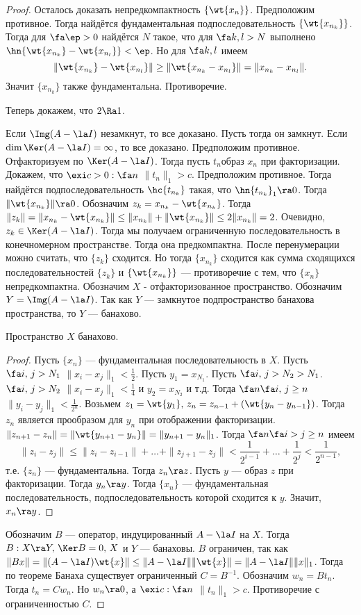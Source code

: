 \documentclass[a4paper]{article}
\begin{document}
\begin{proof}
Осталось доказать непредкомпактность $\{\wt{x_n}\}$.
Предположим противное. Тогда найдётся фундаментальная подпоследовательность
$\{\wt{x_{n_k}}\}$. Тогда для $\fa \ep>0$ найдётся $N$ такое, что для $\fa k,l>N$ выполнено $\hn{\wt{x_{n_k}}-\wt{x_{n_l}}}<\ep$.
Но для $\fa k,l$ имеем
$$\|\wt{x_{n_k}}-\wt{x_{n_l}}\|\ge \|\wt{x_{n_k}-x_{n_l}}\|=\|x_{n_k}-x_{n_l}\|.$$
Значит $\{x_{n_k}\}$ также фундаментальна. Противоречие.

Теперь докажем, что $2\Ra1$.

Если $\Img(A-\la I)$ незамкнут, то все доказано. Пусть тогда  он замкнут. Если $\dim \Ker(A-\la I)=\infty$,
то все доказано. Предположим противное. Отфакторизуем по $\Ker(A-\la I)$. Тогда пусть $t_n$\т образ $x_n$
при факторизации. Докажем, что $\exi c>0: \fa n$ $\|t_n\|_1>c$. Предположим противное. Тогда найдётся
подпоследовательность $\hc{t_{n_k}}$ такая, что $\hn{t_{n_k}}_1\ra 0$. Тогда
$\|\wt{x_{n_k}}\|\ra 0$. Обозначим $z_k=x_{n_k}-\wt{x_{n_k}}$. Тогда
$\|z_k\|=\|x_{n_k}-\wt{x_{n_k}}\|\le\|x_{n_k}\|+\|\wt{x_{n_k}}\|\le 2\|x_{n_k}\|=2$. Очевидно,
$z_k \in \Ker(A-\la I)$. Тогда мы получаем ограниченную последовательность в конечномерном пространстве.
Тогда она предкомпактна. После перенумерации можно считать, что $\{z_k\}$ сходится. Но тогда $\{x_{n_k}\}$
сходится как сумма сходящихся последовательностей $\{z_k\}$ и $\{\wt{x_{n_k}}\}$ --- противоречие с
тем, что $\{x_n\}$ непредкомпактна. Обозначим $X$ - отфакторизованное пространство. Обозначим
$Y=\Img(A-\la I)$. Так как $Y$ --- замкнутое подпространство банахова пространства, то $Y$ --- банахово.

\begin{lemma}
Пространство $X$ банахово.
\end{lemma}
\begin{proof}
Пусть $\{x_n\}$ --- фундаментальная  последовательность в $X$. Пусть $\fa i,\,j>N_1$
$\|x_i-x_j\|_1<\frac1{2}$. Пусть $y_1=x_{N_1}$. Пусть $\fa i,\,j>N_2>N_1$. $\fa i,\,j>N_2$
$\|x_i-x_j\|_1<\frac1{4}$ и $y_2=x_{N_2}$ и т.д. Тогда $\fa n \fa i,\,j\ge n$
$\|y_i-y_j\|_1<\frac1{2^n}$. Возьмем $z_1=\wt{y_1},\, z_n=z_{n-1}+(\wt{y_n-y_{n-1}})$. Тогда
$z_n$ является прообразом для $y_n$ при отображении факторизации.
$\|z_{n+1}-z_n\|=\|\wt{y_{n+1}-y_n}\|=\|y_{n+1}-y_n\|_1$. Тогда $\fa n \fa i>j\ge n$ имеем
$$\|z_i-z_j\|\le\|z_i-z_{i-1}\|+\dots+\|z_{j+1}-z_j\|<\frac1{2^{i-1}}+\dots+\frac1{2^j}<\frac1{2^{n-1}},$$
т.е. $\{z_n\}$ --- фундаментальна. Тогда $z_n\ra z$. Пусть $y$ --- образ $z$ при факторизации. Тогда
$y_n\ra y$. Тогда $\{x_n\}$ --- фундаментальная последовательность, подпоследовательность которой
сходится к $y$. Значит, $x_n\ra y$.
\end{proof}

Обозначим $B$ --- оператор, индуцированный $A-\la I$ на $X$.  Тогда $B:X\ra Y,\, \Ker B=0,\, X$ и
$Y$ --- банаховы. $B$ ограничен, так как $\|Bx\|=\|(A-\la I)\wt{x}\|\le \|A-\la I\|\|\wt{x}\|=\|A-\la I\|\|x\|_1$.
Тогда по теореме Банаха существует ограниченный $C=B^{-1}$. Обозначим $w_n=Bt_n$. Тогда
$t_n=Cw_n$. Но $w_n\ra 0$, а $\exi c: \fa n$ $\|t_n\|_1>c$. Противоречие с ограниченностью $C$.
\end{proof}
\end{document}
